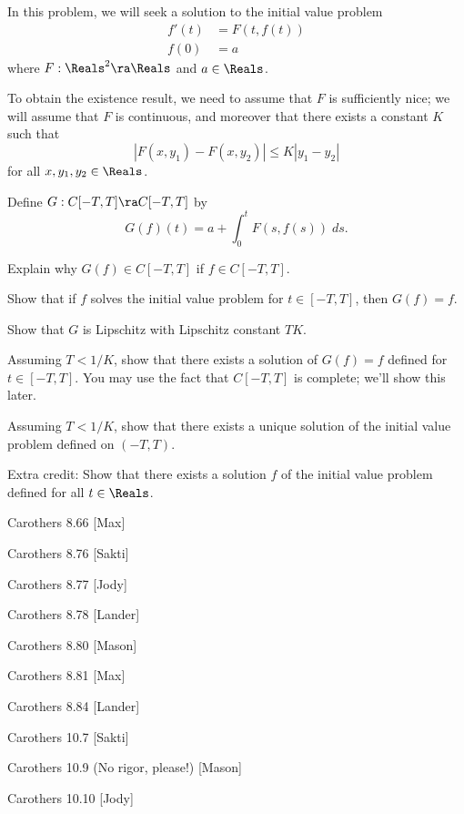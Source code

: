\documentclass[minion]{homework}
\begin{document}
\begin{aproblems}

\hproblem [David]
In this problem, we will seek a solution to the initial value problem
\begin{align*}
f'(t) &= F(t,f(t))\\
f(0) &= a
\end{align*}
where $F:\Reals^2\ra \Reals$ and $a\in\Reals$.

To obtain the existence result, we need to assume that $F$ is sufficiently nice;
we will assume that $F$ is continuous, and moreover that there exists a constant $K$
such that
$$
|F(x,y_1)-F(x,y_2)|\le K |y_1-y_2|
$$
for all $x,y_1,y_2\in\Reals$.

Define $G:C[-T,T]\ra C[-T,T]$ by
$$
G(f)(t) = a + \int_0^t F(s,f(s))\; ds.
$$

\begin{subproblems}
\item Explain why $G(f)\in C[-T,T]$ if $f\in C[-T,T]$.
\item Show that if $f$ solves the initial value problem for $t\in[-T,T]$, then $G(f)=f$.
\item Show that $G$ is Lipschitz with Lipschitz constant $TK$.
\item Assuming $T<1/K$, show that there exists a solution of $G(f)=f$
defined for $t\in [-T,T]$.
You may use the fact that $C[-T,T]$ is complete; we'll show this later.
\item Assuming $T<1/K$, show that there exists a unique solution
of the initial value problem defined on $(-T,T)$.
\item Extra credit:  Show that there exists a solution $f$ of the initial value problem
defined for all $t\in\Reals$.
\end{subproblems}

\hproblem Carothers 8.66 [Max]

\hproblem Carothers 8.76 [Sakti]

\hproblem Carothers 8.77 [Jody]

\hproblem Carothers 8.78 [Lander]

\hproblem Carothers 8.80 [Mason]

\hproblem Carothers 8.81 [Max]

\hproblem Carothers 8.84 [Lander]

\hproblem Carothers  10.7 [Sakti]

\hproblem Carothers  10.9 (No rigor, please!) [Mason]

\hproblem Carothers  10.10 [Jody]


\end{aproblems}
\end{document}
